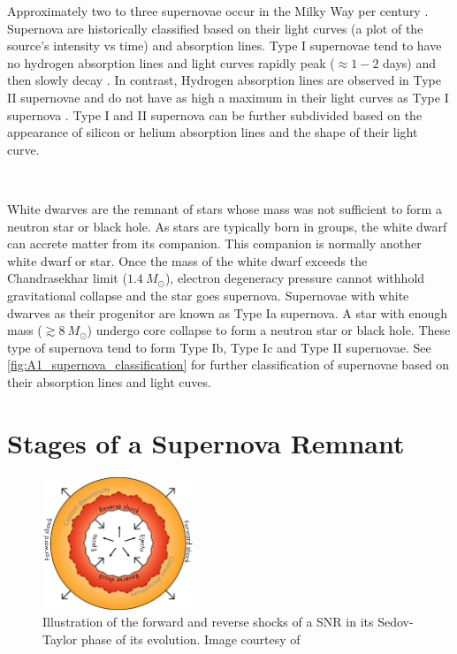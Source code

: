 Approximately two to three supernovae occur in the Milky Way per century \citep{1984AuJPh..37..321M,1994ApJS...92..487T}. Supernova are historically classified based on their light curves (a plot of the source's intensity vs time) and absorption lines. Type I supernovae tend to have no hydrogen absorption lines and light curves rapidly peak ($\approx 1-2$ days) and then slowly decay \citep{alma9928040781501811}. In contrast, Hydrogen absorption lines are observed in Type II supernovae and do not have as high a maximum in their light curves as Type I supernova \citep{alma9928040781501811}. Type I and II supernova can be further subdivided based on the appearance of silicon or helium absorption lines and the shape of their light curve.
\par~\par
White dwarves are the remnant of stars whose mass was not sufficient to form a neutron star or black hole. As stars are typically born in groups, the white dwarf can accrete matter from its companion. This companion is normally another white dwarf or star. Once the mass of the white dwarf exceeds the Chandrasekhar limit ($1.4~M_\odot$), electron degeneracy pressure cannot withhold gravitational collapse and the star goes supernova. Supernovae with white dwarves as their progenitor are known as Type Ia supernova. A star with enough mass ($\gtrsim 8~M_\odot$) undergo core collapse to form a neutron star or black hole. These type of supernova tend to form Type Ib, Type Ic and Type II supernovae. See \autoref{fig:A1_supernova_classification} for further classification of supernovae based on their absorption lines and light cuves.

\section{Stages of a Supernova Remnant}

\begin{figure}
	    \centering
	    \includegraphics[width=0.4\textwidth]{A1_Supernova_Remnants/Images/SNR_evolution.png}
	    \caption{Illustration of the forward and reverse shocks of a SNR in its Sedov-Taylor phase of its evolution. Image courtesy of \cite{alma9928040781501811}}
	    \label{fig:A1_SNR_Evolution}
\end{figure}

